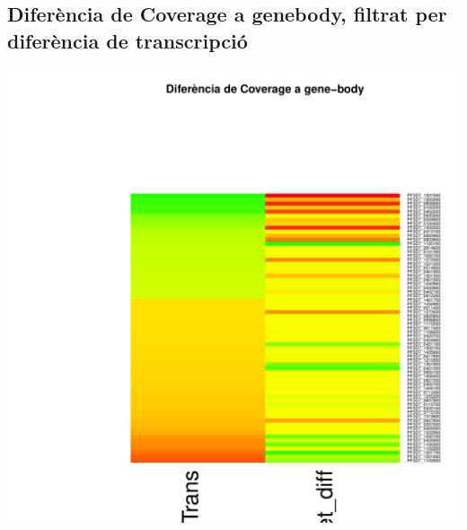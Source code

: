 \documentclass{article}\usepackage[]{graphicx}\usepackage[]{color}
\newenvironment{knitrout}{}{} %
\begin{document}
\subsection{Diferència de Coverage a genebody, filtrat per diferència de transcripció}
\begin{knitrout}
\color{fgcolor}

{\centering \includegraphics[width=.9\linewidth]{figure/minimal-_heat_cov_diff_body-1} 

}



\end{knitrout}
\clearpage
\end{document}

